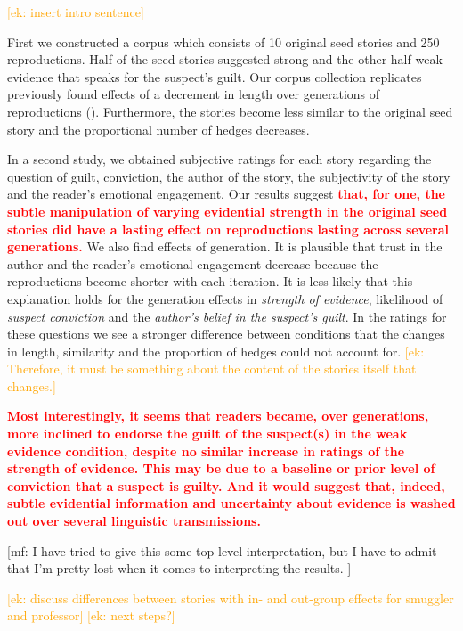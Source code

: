 \documentclass[10pt,letterpaper]{article}
\newcommand{\ek}[1]{\textcolor{Orange}{[ek: #1]}}
\newcommand{\mf}[1]{\textcolor{PinkyPurple}{[mf: #1]}}
\begin{document}
\ek{insert intro sentence}

First we constructed a corpus which consists of 10 original seed stories and 250 reproductions. Half of the seed stories suggested strong and the other half weak evidence that speaks for the suspect's guilt. Our corpus collection replicates previously found effects of a decrement in length over generations of reproductions (\cite{Bartlett:1932}). Furthermore, the stories become less similar to the original seed story and the proportional number of hedges decreases.

In a second study, we obtained subjective ratings for each story regarding the question of guilt, conviction, the author of the story, the subjectivity of the story and the reader's emotional engagement. Our results suggest \textbf{\textcolor{red}{that, for one, the subtle manipulation of varying evidential strength in the original seed stories did have a lasting effect on reproductions lasting across several generations.}} We also find effects of generation. It is plausible that trust in the author and the reader's emotional engagement decrease because the reproductions become shorter with each iteration. It is less likely that this explanation holds for the generation effects in \textit{strength of evidence}, likelihood of \textit{suspect conviction} and the \textit{author's belief in the suspect's guilt}. In the ratings for these questions we see a stronger difference between conditions that the changes in length, similarity and the proportion of hedges could not account for. \ek{Therefore, it must be something about the content of the stories itself that changes.}

\textbf{\textcolor{red}{ Most interestingly, it seems that readers became, over generations, more inclined to endorse the guilt of the suspect(s) in the weak evidence condition, despite no similar increase in ratings of the strength of evidence. This may be due to a baseline or prior level of conviction that a suspect is guilty. And it would suggest that, indeed, subtle evidential information and uncertainty about evidence is washed out over several linguistic transmissions.}}

\mf{I have tried to give this some top-level interpretation, but I have to admit that I'm pretty lost when it comes to interpreting the results. }

    
\ek{discuss differences between stories with in- and out-group effects for smuggler and professor}
\ek{next steps?}
\end{document}
